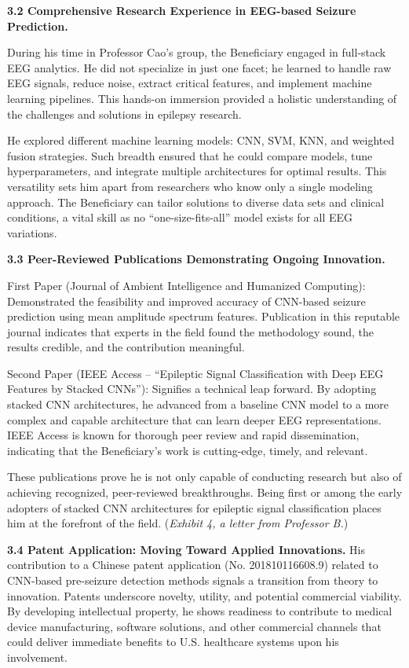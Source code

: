 \documentclass{article}
\begin{document}
{\bf 3.2 Comprehensive Research Experience in EEG-based Seizure Prediction.}

During his time in Professor Cao’s group, the Beneficiary engaged in full-stack EEG analytics. He did not specialize in just one facet; he learned to handle raw EEG signals, reduce noise, extract critical features, and implement machine learning pipelines. This hands-on immersion provided a holistic understanding of the challenges and solutions in epilepsy research.

He explored different machine learning models: CNN, SVM, KNN, and weighted fusion strategies. Such breadth ensured that he could compare models, tune hyperparameters, and integrate multiple architectures for optimal results. This versatility sets him apart from researchers who know only a single modeling approach. The Beneficiary can tailor solutions to diverse data sets and clinical conditions, a vital skill as no “one-size-fits-all” model exists for all EEG variations.


{\bf 3.3 Peer-Reviewed Publications Demonstrating Ongoing Innovation.}

First Paper (Journal of Ambient Intelligence and Humanized Computing):
Demonstrated the feasibility and improved accuracy of CNN-based seizure prediction using mean amplitude spectrum features. Publication in this reputable journal indicates that experts in the field found the methodology sound, the results credible, and the contribution meaningful.

Second Paper (IEEE Access – “Epileptic Signal Classification with Deep EEG Features by Stacked CNNs”):
Signifies a technical leap forward. By adopting stacked CNN architectures, he advanced from a baseline CNN model to a more complex and capable architecture that can learn deeper EEG representations. IEEE Access is known for thorough peer review and rapid dissemination, indicating that the Beneficiary’s work is cutting-edge, timely, and relevant.

These publications prove he is not only capable of conducting research but also of achieving recognized, peer-reviewed breakthroughs. Being first or among the early adopters of stacked CNN architectures for epileptic signal classification places him at the forefront of the field. ({\it Exhibit 4, a letter from Professor B.})

{\bf 3.4 Patent Application: Moving Toward Applied Innovations.}
His contribution to a Chinese patent application (No. 201810116608.9) related to CNN-based pre-seizure detection methods signals a transition from theory to innovation. Patents underscore novelty, utility, and potential commercial viability. By developing intellectual property, he shows readiness to contribute to medical device manufacturing, software solutions, and other commercial channels that could deliver immediate benefits to U.S. healthcare systems upon his involvement.
\end{document}
